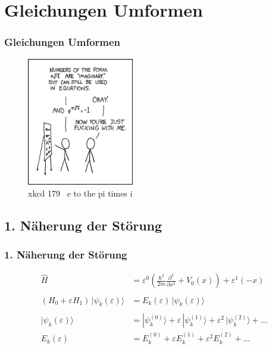 \documentclass[aspectratio=169]{beamer}
\begin{document}
\section{ Gleichungen Umformen }
\begin{frame}
  \frametitle{ Gleichungen Umformen }
  \begin{figure}
    \centering
    \includegraphics[height=5.6cm]{./179_e_to_the_pi_times_i.png}
    \caption{ xkcd 179 \textendash \ e to the pi times i }
    \label{abb:179_e_to_the_pi_times_i}
  \end{figure}
\end{frame}

\subsection{ 1. N\"aherung der St\"orung }
\begin{frame}
  \frametitle{ 1. N\"aherung der St\"orung }
  \begin{align*}
    \hat{H} &= \varepsilon^0 ( \frac{\hbar^2}{2m} \frac{\partial^2}{\partial x^2} + V_0(x) )
               + \varepsilon^1 (  - x )
  \\
  \\
    (H_0+\varepsilon H_1)\,|\psi_k(\varepsilon)\rangle
    &=
    E_k(\varepsilon)\,|\psi_k(\varepsilon)\rangle
  \\
  \\
    |\psi_k(\varepsilon)\rangle
    &=
    |\psi_k^{(0)}\rangle+\varepsilon\,|\psi_k^{(1)}\rangle
    +\varepsilon^2\,|\psi_k^{(2)}\rangle+\dots
  \\
    E_k(\varepsilon)
    &=
    E_k^{(0)}+\varepsilon E_k^{(1)} + \varepsilon^2 E_k^{(2)}+\dots
  \end{align*}
  
\end{frame}
\end{document}
